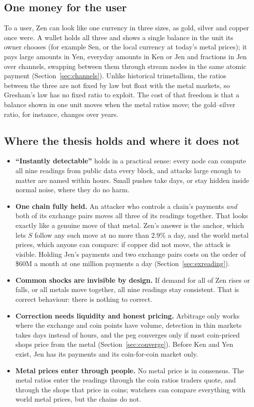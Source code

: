 \subsection{One money for the user}
To a user, Zen can look like one currency in three sizes, as gold, silver and copper once were. A wallet holds all three and shows a single balance in the unit its owner chooses (for example Sen, or the local currency at today's metal prices); it pays large amounts in Yen, everyday amounts in Ken or Jen and fractions in Jen over channels, swapping between them through stream nodes in the same atomic payment (Section~\ref{sec:channels}). Unlike historical trimetallism, the ratios between the three are not fixed by law but float with the metal markets, so Gresham's law has no fixed ratio to exploit. The cost of that freedom is that a balance shown in one unit moves when the metal ratios move; the gold--silver ratio, for instance, changes over years.

\subsection{Where the thesis holds and where it does not}\label{sec:sclimits}
\begin{itemize}
\item \textbf{``Instantly detectable''} holds in a practical sense: every node can compute all nine readings from public data every block, and attacks large enough to matter are named within hours. Small pushes take days, or stay hidden inside normal noise, where they do no harm.
\item \textbf{One chain fully held.} An attacker who controls a chain's payments \emph{and} both of its exchange pairs moves all three of its readings together. That looks exactly like a genuine move of that metal. Zen's answer is the anchor, which lets $S$ follow any such move at no more than 2.9\% a day, and the world metal prices, which anyone can compare: if copper did not move, the attack is visible. Holding Jen's payments and two exchange pairs costs on the order of \$60M a month at one million payments a day (Section~\ref{sec:exreading}).
\item \textbf{Common shocks are invisible by design.} If demand for all of Zen rises or falls, or all metals move together, all nine readings stay consistent. That is correct behaviour: there is nothing to correct.
\item \textbf{Correction needs liquidity and honest pricing.} Arbitrage only works where the exchange and coin points have volume, detection in thin markets takes days instead of hours, and the peg converges only if most coin-priced shops price from the metal (Section~\ref{sec:converge}). Before Ken and Yen exist, Jen has its payments and its coin-for-coin market only.
\item \textbf{Metal prices enter through people.} No metal price is in consensus. The metal ratios enter the readings through the coin ratios traders quote, and through the shops that price in coins; watchers can compare everything with world metal prices, but the chains do not.
\end{itemize}
